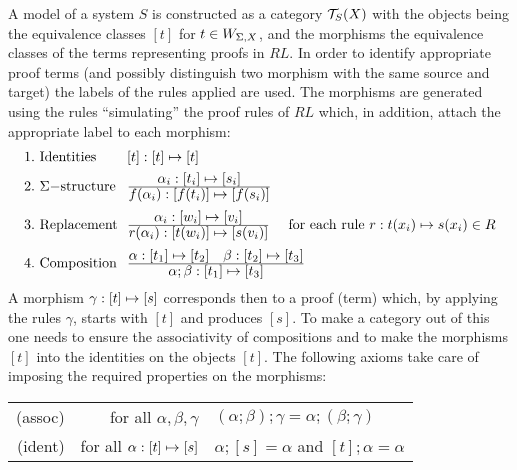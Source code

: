 {A model of a system $S$ is constructed as a category ${\cal T}_{S}(X)$ with the objects 
being the equivalence classes $[t]$ 
for $t\in W_{{\Sigma,X}}$, and the morphisms the equivalence classes of the terms 
representing proofs in $RL$. In order to 
identify appropriate proof terms (and possibly distinguish two morphism with the same source and target) 
the labels of the rules applied are used. The morphisms are generated using 
the rules ``simulating'' the proof 
rules of $RL$ which, in addition, attach the appropriate label to each morphism: 
\[ \begin{array}{l@{\ \ }l}
{\rm 1.\  Identities} & [t] : [t] \rew [t] \\[1ex]	
{\rm 2.\ }\Sigma{\rm-structure} & \prule{\alpha_{i} : [t_{i}]\rew 
[s_{i}]} {f(\alpha_{i}) : [f(t_{i})] \rew [f(s_{i})]} \\[2.5ex]
{\rm 3.\ Replacement} & \prule{\alpha_{i} : [w_{i}]\rew [v_{i}]} {r(\alpha_{i}) : [t(w_{i})] \rew 
[s(v_{i})]}\ \ \ \  {\rm for\ each\ rule\ } r: t(x_{i}) \rew 
s(x_{i}) \in R \\[2.5ex]
{\rm 4.\ Composition} & \prule{\alpha : [t_{1}]\rew [t_{2}]\ \ \ 
\beta : [t_{2}]\rew [t_{3}]}{\alpha;\beta : [t_{1}]\rew [t_{3}]}
\end{array}
\]
A morphism $\gamma: [t]\mathrel{\mapsto} [s]$ corresponds then to a proof (term) which, 
by applying the rules $\gamma$, starts with $[t]$ 
and produces $[s]$. To make a category out of this one needs to ensure the associativity of compositions and 
to make the morphisms $[t]$ into the identities on the objects $[t]$. The following axioms take care of 
imposing the required properties on the morphisms:  \\[.5ex]
\hspace*{2em}
\begin{tabular}{rr@{\ \ :\ \ }l}
(assoc)  &	for all $\alpha, \beta, \gamma$  &  $(\alpha; \beta);\gamma = 
\alpha ; (\beta ; \gamma)$ \\[.5ex]	 
(ident)  &     for all $\alpha: [t] \mathrel{\mapsto} [s]$ &  $\alpha ; [s] = 
\alpha$ and $[t]; \alpha = \alpha $ \\[.5ex]
\end{tabular}

}

